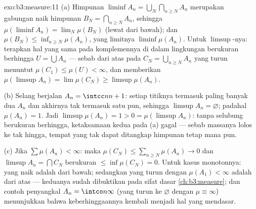 \begin{solution}{exo:b3:measure:11}
(a) Himpunan $\liminf A_n = \bigcup_N\bigcap_{n\geq N}A_n$ merupakan
gabungan naik himpunan $B_N = \bigcap_{n\geq N}A_n$,
sehingga $\mu(\liminf A_n) = \lim_N\mu(B_N)$ (lewat  dari
bawah); dan $\mu(B_N) \leq \inf_{n \geq N}\mu(A_n)$, yang
limitnya $\liminf\mu(A_n)$. Untuk $\limsup$-nya: terapkan hal
yang sama pada komplemennya di dalam lingkungan berukuran berhingga
$U = \bigcup A_n$ --- sebab  dari atas pada
$C_N = \bigcup_{n\geq N}A_n$ yang turun menuntut $\mu(C_1)
\leq \mu(U) < \infty$, dan memberikan $\mu(\limsup A_n) =
\lim\mu(C_N) \geq \limsup\mu(A_n)$.

(b) Selang berjalan $A_n = \intcc n{n+1}$: setiap titiknya
termasuk paling banyak dua $A_n$ dan akhirnya tak termasuk satu pun,
sehingga $\limsup A_n = \varnothing$; padahal $\mu(A_n) = 1$. Jadi
$\limsup\mu(A_n) = 1 > 0 = \mu(\limsup A_n)$: tanpa selubung
berukuran berhingga, ketaksamaan kedua pada (a) gagal
--- sebab massanya lolos ke tak hingga, tempat yang tak dapat
ditangkap himpunan tetap mana pun.

(c) Jika $\sum\mu(A_n) < \infty$: maka $\mu(C_N) \leq
\sum_{n\geq N}\mu(A_n) \to 0$ dan $\limsup A_n =
\bigcap C_N$ berukuran $\leq \inf\mu(C_N) = 0$. Untuk kasus
monotonnya: yang naik adalah  dari bawah; sedangkan yang turun dengan
$\mu(A_1) < \infty$ adalah  dari atas ---
keduanya sudah dibuktikan pada sifat dasar \cref{ch:b3:measure}; dan
contoh penyangkal $A_n = \intco n\infty$ (yang turun ke
$\varnothing$ dengan $\mu \equiv \infty$) menunjukkan bahwa keberhinggaannya
kembali menjadi hal yang mendasar.
\end{solution}

